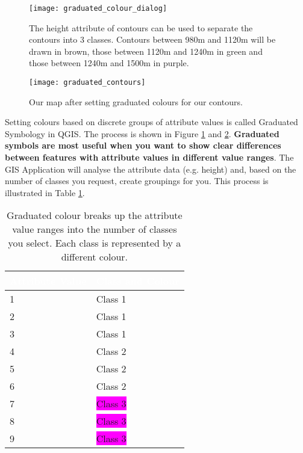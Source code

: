 \begin{figure}[ht]
   \begin{center}
   \caption{The height attribute of contours can be used to separate the
contours into 3 classes. Contours between 980m and 1120m will be drawn in
brown, those between 1120m and 1240m in green and those between 1240m and
1500m in purple.}
\label{fig:gradcoldialog}\smallskip
   \texttt{[image: graduated\_colour\_dialog]}
\end{center}
\end{figure}


\begin{figure}[ht]
   \begin{center}
   \caption{Our map after setting graduated colours for our contours.}
\label{fig:gradcontours}\smallskip
   \texttt{[image: graduated\_contours]}
\end{center}
\end{figure}

Setting colours based on discrete groups of attribute values is called
Graduated Symbology in QGIS. The process is shown in Figure
\ref{fig:gradcoldialog} and \ref{fig:gradcontours}. \textbf{Graduated symbols
are most useful when you want to show clear
differences between features with attribute values in different value ranges}.
The GIS Application will analyse the attribute data (e.g. height) and, based
on the number of classes you request, create groupings for you. This process
is illustrated in Table \ref{tab:gradcolor}.

\begin{table}[ht]
\centering
\caption{Graduated colour breaks up the attribute value ranges into the
number of classes you select. Each class is represented by a different
colour.}\medskip
 \label{tab:gradcolor}
 \begin{tabular}{|p{8cm}|p{8cm}|}
 \hline
 \rowcolor{black}
 \textcolor{white}{\textbf{Attribute Value}} &
 \textcolor{white}{\textbf{Class and Colour}} \\
 \hline 1 & \colorbox{Apricot}{Class 1} \\
 \hline 2 & \colorbox{Apricot}{Class 1} \\
 \hline 3 & \colorbox{Apricot}{Class 1} \\
 \hline 4 & \colorbox{PineGreen}{Class 2} \\
 \hline 5 & \colorbox{PineGreen}{Class 2} \\
 \hline 6 & \colorbox{PineGreen}{Class 2} \\
 \hline 7 & \colorbox{Magenta}{Class 3} \\
 \hline 8 & \colorbox{Magenta}{Class 3} \\ 
 \hline 9 & \colorbox{Magenta}{Class 3} \\
\hline
\end{tabular}
\end{table}

